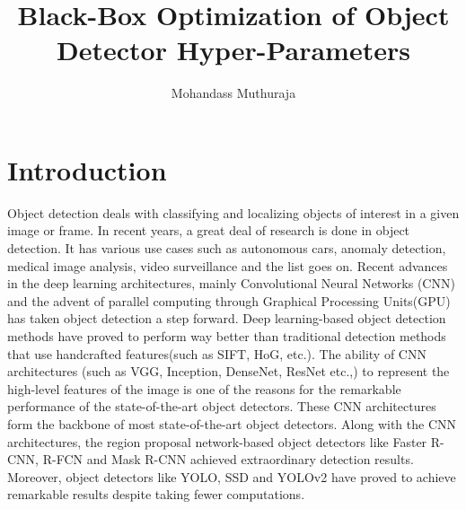 \documentclass[thesis]{mas_proposal}
\title{Black-Box Optimization of Object Detector Hyper-Parameters}
\author{Mohandass Muthuraja}
\date{}
\begin{document}
\maketitle

\pagestyle{plain}

\section{Introduction}
Object detection deals with classifying and localizing objects of interest in a given image or frame. In recent years, a great deal of research is done in object detection. It has various use cases such as autonomous cars, anomaly detection, medical image analysis, video surveillance and the list goes on. Recent advances in the deep learning architectures, mainly Convolutional Neural Networks (CNN) and the advent of parallel computing through Graphical Processing Units(GPU) has taken object detection a step forward. Deep learning-based object detection methods have proved to perform way better than traditional detection methods that use handcrafted features(such as SIFT\cite{lowe2004distinctive}, HoG\cite{dalal2005histograms}, etc.)\cite{zou2019object}. The ability of CNN architectures (such as VGG\cite{simonyan2014very}, Inception\cite{szegedy2015going}, DenseNet\cite{huang2017densely}, ResNet\cite{he2016deep} etc.,) to represent the high-level features of the image is one of the reasons for the remarkable performance of the state-of-the-art object detectors. These CNN architectures form the backbone of most state-of-the-art object detectors. Along with the CNN architectures, the region proposal network-based object detectors like Faster R-CNN\cite{ren2015faster}, R-FCN\cite{dai2016r} and  Mask R-CNN\cite{he2017mask} achieved extraordinary detection results. Moreover, object detectors like YOLO\cite{redmon2016you}, SSD\cite{liu2016ssd} and YOLOv2\cite{redmon2017yolo9000}  have proved to achieve remarkable results despite taking fewer computations\cite{zhao2019object}. 
\end{document}
